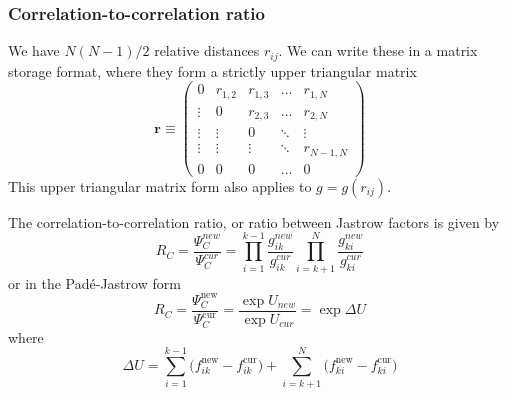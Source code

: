 \documentclass[11pt]{article}
\begin{document}
	\subsubsection{Correlation-to-correlation ratio}

		We have $N\left(N-1\right)/2$ relative distances $r_{ij}$. We can
		write these in a matrix storage format, where they form a strictly
		upper triangular matrix
		\[
		\mathbf{r}\equiv\left(\begin{array}{ccccc}
		0 & r_{1,2} & r_{1,3} & \dots & r_{1,N}\\
		\vdots & 0 & r_{2,3} & \dots & r_{2,N}\\
		\vdots & \vdots & 0 & \ddots & \vdots\\
		\vdots & \vdots & \vdots & \ddots & r_{N-1,N}\\
		0 & 0 & 0 & \dots & 0
		\end{array}\right)
		\]
		This upper triangular matrix form also applies to $g=g\left(r_{ij}\right)$.

		The correlation-to-correlation ratio, or ratio between Jastrow factors
		is given by
		\[
		R_{C}=\frac{\Psi_{C}^{new}}{\Psi_{C}^{cur}}=\prod_{i=1}^{k-1}\frac{g_{ik}^{new}}{g_{ik}^{cur}}\prod_{i=k+1}^{N}\frac{g_{ki}^{new}}{g_{ki}^{cur}}
		\]
		or in the Padé-Jastrow form
		\[
		R_{C}=\frac{\Psi_{C}^{\mathrm{new}}}{\Psi_{C}^{\mathrm{cur}}}=\frac{\exp U_{new}}{\exp U_{cur}}=\exp \Delta U
		\]
		where 
		\[
		\Delta U =
		\sum_{i=1}^{k-1}\big(f_{ik}^\mathrm{new}-f_{ik}^\mathrm{cur}\big)
		+
		\sum_{i=k+1}^{N}\big(f_{ki}^\mathrm{new}-f_{ki}^\mathrm{cur}\big)
		\]
\end{document}
